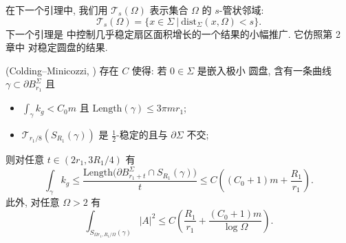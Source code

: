 在下一个引理中, 我们用 $\mathcal T_s(\Omega)$ 表示集合 $\Omega$ 的
$s$-管状邻域:
\[
\mathcal T_s(\Omega)=\{x\in\Sigma\ \big|\ \mathrm{dist}_\Sigma(x,\Omega)<s\}.
\]
下一个引理是 \cite{CM3} 中控制几乎稳定扇区面积增长的一个结果的小幅推广.
它仿照第 2 章中 \cite{CM2} 对稳定圆盘的结果.

\begin{lemma}
\label{lem:8.7}
(Colding--Minicozzi, \cite{CM3}) 存在 $C$ 使得: 若 $0\in\Sigma$ 是嵌入极小
圆盘, 含有一条曲线 $\gamma\subset\partial B_{r_1}^\Sigma$ 且

\begin{itemize}
\item $\int_\gamma k_g<C_0m$ 且 $\mathrm{Length}(\gamma)\leq3\pi m r_1$;

\item $\mathcal T_{r_1/8}(S_{R_1}(\gamma))$ 是 $\frac12$-稳定的且与
$\partial\Sigma$ 不交;
\end{itemize}

则对任意 $t\in(2r_1,3R_1/4)$ 有
\begin{equation}
\int_\gamma k_g
\leq\frac{\mathrm{Length}\bigl(\partial B_{r_1+t}^\Sigma\cap S_{R_1}(\gamma)\bigr)}{t}
\leq C\left((C_0+1)m+\frac{R_1}{r_1}\right).
\label{eq:8.19}
\end{equation}
此外, 对任意 $\Omega>2$ 有
\begin{equation}
\int_{S_{\Omega r_1,R_1/\Omega}(\gamma)}|A|^2
\leq C\left(\frac{R_1}{r_1}+\frac{(C_0+1)m}{\log\Omega}\right).
\label{eq:8.20}
\end{equation}
\end{lemma}


